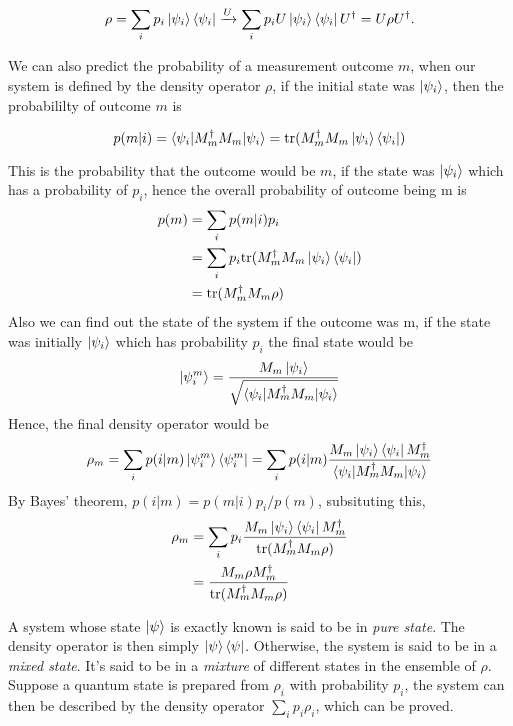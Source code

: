 \begin{equation}
    \rho = \sum_i p_i\ket{\psi_i}\bra{\psi_i} 
    \xrightarrow{U}
    \sum_i p_i U\ket{\psi_i}\bra{\psi_i}U^\dag
    = U\rho U^\dag.
\end{equation}

We can also predict the probability of a measurement outcome $m$, when our system is defined by the density operator $\rho$, if the initial state was $\ket{\psi_i}$, then the probabililty of outcome $m$ is

\begin{equation}
    p(m|i) = \braket{\psi_i |M_m^\dag M_m| \psi_i}
    = \text{tr}(M_m^\dag M_m \ket{\psi_i}\bra{\psi_i})
\end{equation}

This is the probability that the outcome would be $m$, if the state was $\ket{\psi_i}$ which has a probability of $p_i$, hence the overall probability of outcome being m is
\begin{align}
    p(m) &= \sum_i p(m|i)p_i \\
    &= \sum_i p_i\text{tr}(M_m^\dag M_m\ket{\psi_i}\bra{\psi_i}) \\
    &= \text{tr}(M_m^\dag M_m \rho)
\end{align}
Also we can find out the state of the system if the outcome was m, if the state was initially $\ket{\psi_i}$ which has probability $p_i$ the final state would be
\begin{equation}
    \ket{\psi_i^m} = \frac{M_m\ket{\psi_i}}{
    \sqrt{\braket{\psi_i | M_m^\dag M_m | \psi_i}}
    }
\end{equation}
Hence, the final density operator would be
\begin{equation}
    \rho_m = \sum_i p(i|m)\ket{\psi_i^m}\bra{\psi_i^m} = 
    \sum_i p(i|m)\frac{M_m\ket{\psi_i}\bra{\psi_i}M_m^\dag}{\braket{
    \psi_i| M_m^\dag M_m |\psi_i
    }}
\end{equation}
By Bayes' theorem, $p(i|m) = p(m|i)p_i/p(m)$, subsituting this,
\begin{align}
    \rho_m &= \sum_i p_i \frac{M_m\ket{\psi_i}\bra{\psi_i}M_m^\dag}{\text{tr}(M_m^\dag M_m \rho)} \\
    &= \frac{M_m\rho M_m^\dag}{\text{tr}(M_m^\dag M_m \rho)}
\end{align}

A system whose state $\ket{\psi}$ is exactly known is said to be in \textit{pure state}. The density operator is then simply $\ket{\psi}\bra{\psi}$. Otherwise, the system is said to be in a \textit{mixed state}. It's said to be in a \textit{mixture} of different states in the ensemble of $\rho$. Suppose a quantum state is prepared from $\rho_i$ with probability $p_i$, the system can then be described by the density operator $\sum_i p_i\rho_i$, which can be proved.

